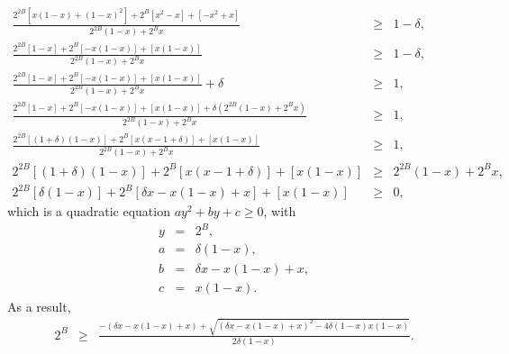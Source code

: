 \begin{example}
\begin{eqnarray}
%
 \frac
  {2^{2B}\left[x (1-x)+(1-x)^2\right]+2^B\left[x^2-x\right]+\left[-x^2
   +{x}\right]}
  {2^{2B}(1-x)+2^Bx}
&\geq& 1-\delta,\\
%
 \frac
  {2^{2B}\left[1-x\right]+2^B\left[-x(1-x)\right]+\left[x(1-x)\right]}
  {2^{2B}(1-x)+2^Bx}
&\geq& 1-\delta,\\
%
 \frac
  {2^{2B}\left[1-x\right]+2^B\left[-x(1-x)\right]+\left[x(1-x)\right]}
  {2^{2B}(1-x)+2^Bx} + \delta
&\geq& 1,\\
%
 \frac
  {2^{2B}\left[1-x\right]+2^B\left[-x(1-x)\right]+\left[x(1-x)\right]
   + \delta(2^{2B}(1-x)+2^Bx)}
  {2^{2B}(1-x)+2^Bx}
&\geq& 1,\\
%
 \frac
  {2^{2B}\left[(1+\delta)(1-x)\right]+2^B\left[x(x-1+\delta)\right]+\left[x(1-x)\right]}
  {2^{2B}(1-x)+2^Bx}
&\geq& 1,\\
%
  {2^{2B}\left[(1+\delta)(1-x)\right]+2^B\left[x(x-1+\delta)\right]+\left[x(1-x)\right]}
&\geq& {2^{2B}(1-x)+2^Bx},\\
%
  2^{2B}\left[\delta(1-x)\right]
  +2^B\left[\delta x-x(1-x)+x\right]
  +\left[ x(1-x)\right]
&\geq& 0,
\end{eqnarray}
which is a quadratic equation $ay^2+by+c\geq0$, with
\begin{eqnarray}
y &=& 2^B,\\
a &=& \delta(1-x),\\
b &=& \delta x-x(1-x)+x,\\
c &=& x(1-x).
\end{eqnarray}
As a result,
\begin{eqnarray}
2^B &\geq&
 \frac{
  -(\delta x - x(1-x) + x)
  +\sqrt{
   (\delta x - x(1-x) + x)^2 - 4\delta(1-x)x(1-x)
  }
 }
 {2\delta(1-x)}.
\end{eqnarray}

\end{example}


